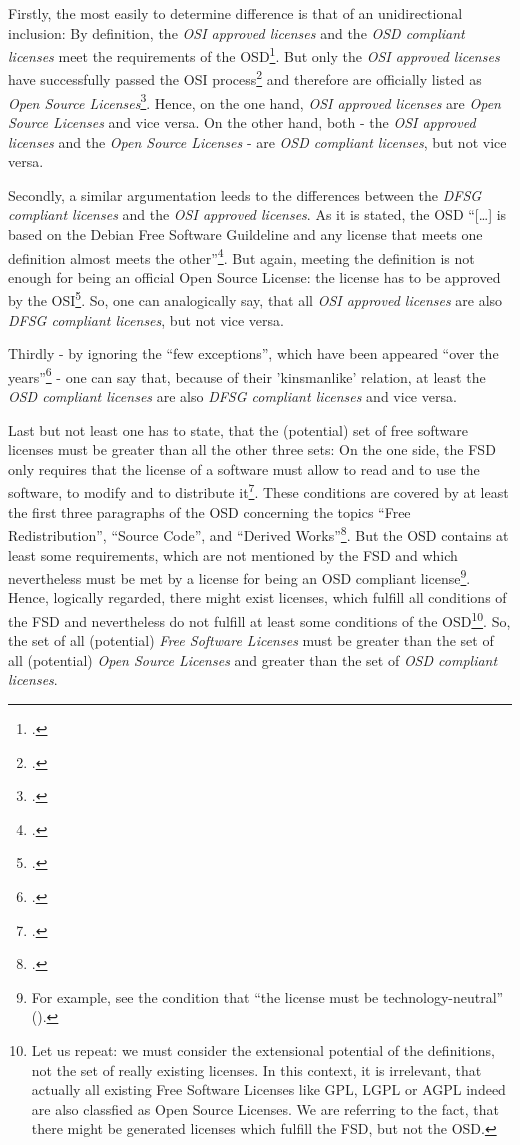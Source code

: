 Firstly, the most easily to determine difference is that of an unidirectional
inclusion: By definition, the \emph{OSI approved licenses} and the \emph{OSD
compliant licenses} meet the requirements of the OSD\footcite[cf.][\nopage
wp]{OSI2012a}. But only the \emph{OSI approved licenses} have successfully
passed the OSI process\footcite[cf.][\nopage wp]{OSI2012a} and therefore are
officially listed as \emph{Open Source Licenses}\footcite[cf.][\nopage
wp]{OSI2012b}. Hence, on the one hand, \emph{OSI approved licenses} are
\emph{Open Source Licenses} and vice versa. On the other hand, both - the
\emph{OSI approved licenses} and the \emph{Open Source Licenses} - are \emph{OSD
compliant licenses}, but not vice versa.

Secondly, a similar argumentation leeds to the differences between the
\emph{DFSG compliant licenses} and the \emph{OSI approved licenses}. As it is
stated, the OSD \enquote{[\ldots] is based on the Debian Free Software
Guildeline and any license that meets one definition almost meets the
other}\footcite[cf.][233]{Fogel2006a}. But again, meeting the definition is not
enough for being an official Open Source License: the license has to be approved
by the OSI\footcite[cf.][\nopage wp]{OSI2012b}. So, one can analogically say,
that all \emph{OSI approved licenses} are also \emph{DFSG compliant licenses},
but not vice versa.

Thirdly - by ignoring the \enquote{few exceptions}, which have been appeared
\enquote{over the years}\footcite[cf.][233]{Fogel2006a} - one can say that,
because of their 'kinsmanlike' relation, at least the \emph{OSD compliant
licenses} are also \emph{DFSG compliant licenses} and vice versa.

Last but not least one has to state, that the (potential) set of free software
licenses must be greater than all the other three sets: On the one side, the FSD
only requires that the license of a software must allow to read and to use the
software, to modify and to distribute it\footcite[cf.][41]{Stallman1996a}. These
conditions are covered by at least the first three paragraphs of the OSD
concerning the topics \enquote{Free Redistribution}, \enquote{Source Code}, and
\enquote{Derived Works}\footcite[cf.][\nopage wp]{OSI2012a}. But the OSD
contains at least some requirements, which are not mentioned by the FSD and
which nevertheless must be met by a license for being an OSD compliant
license\footnote{For example, see the condition that \enquote{the license must
be technology-neutral} (\cite[cf.][\nopage wp]{OSI2012a}).}. Hence, logically
regarded, there might exist licenses, which fulfill all conditions of the FSD
and nevertheless do not fulfill at least some conditions of the OSD\footnote{
Let us repeat: we must consider the extensional potential of the definitions,
not the set of really existing licenses. In this context, it is irrelevant, that
actually all existing Free Software Licenses like GPL, LGPL or AGPL indeed are
also classfied as Open Source Licenses. We are referring to the fact, that there
might be generated licenses which fulfill the FSD, but not the OSD.}. So, the
set of all (potential) \emph{Free Software Licenses} must be greater than the
set of all (potential) \emph{Open Source Licenses} and greater than the set of
\emph{OSD compliant licenses}.

